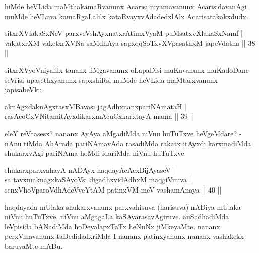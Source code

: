 \begin{artha}
hiMde heVLida maMthakamaRvanunx Acarisi niyamavanunx AcarisidavanAgi 
muMde heVLuva kamaRgaLalilx kataRvayxvAdadedxlAlx Acarisatakakxdudx.
\end{artha}


\begin{shl}
sitxrXVlakaSxNeV parxveVshAyxnatxrAtimxVyaM puMsatxvXlakaSxNamf | \\
vakatxrXM vaketxrXVNa saMdhAya sapxqqSoTxvXVpasathxM japeVdatha \hfill|| 38 || 
\end{shl}

\begin{artha}
sitxrXVyoVniyalilx tananx liMgavanunx oLapaDisi muKavanunx muKadoDane 
seVrisi upasethxyanunx sapxshiRsi muMde heVLida maMtarxvanunx 
japisabeVku.
\end{artha}


\begin{shl}
aknAgxdaknAgxtasxMBavasi jagAdhxnanxpariNAmataH | \\
rasAcoCxVNitamitAyxdikarxmAcuCxkarxtayA mama \hfill|| 39 || 
\end{shl}

\begin{artha}
eleY reVtasesx? nananx AyAya aMgadiMda niVnu huTuTxve heVgeMdare? - 
nAnu tiMda AhArada pariNAmavAda rasadiMda rakatx itAyxdi 
karxmadiMda shukarxvAgi pariNAma hoMdi idariMda niVnu huTuTxve.
\end{artha}


\begin{shl}
shukarxparxvahayA nADAyx haqdayAcAcxBijAyaseV | \\
sa tavxmaknagxkaSAyoV\s si digadhxvidAdhxM maqgiVmiva | \\
senxVhoVparoVdhAdeVveYtAM patinxVM meV vashamAnaya \hfill|| 40 || 
\end{shl}

\begin{artha}
haqdayada mUlaka shukarxvanunx parxvahisuva (harisuva) nADiya mUlaka 
niVnu huTuTxve. niVnu aMgagaLa kaSAyarasavAgiruve. auSadhadiMda 
leVpisida bANadiMda hoDeyalapxTaTx heNuNx jiMkeyaMte. nananx 
perxVmavanunx taDedidadxriMda I nananx patinxyanunx nananx vashakekx 
baruvaMte mADu.
\end{artha}

